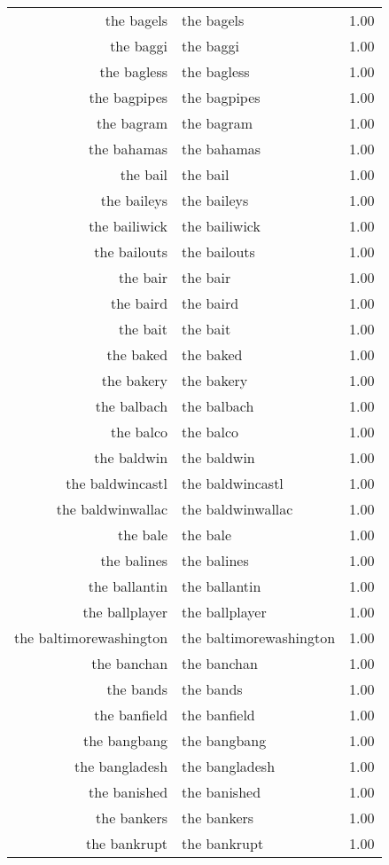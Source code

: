 \begin{table}[ht]
\begin{tabular}{rlr}
  the bagels & the bagels & 1.00 \\ 
  the baggi & the baggi & 1.00 \\ 
  the bagless & the bagless & 1.00 \\ 
  the bagpipes & the bagpipes & 1.00 \\ 
  the bagram & the bagram & 1.00 \\ 
  the bahamas & the bahamas & 1.00 \\ 
  the bail & the bail & 1.00 \\ 
  the baileys & the baileys & 1.00 \\ 
  the bailiwick & the bailiwick & 1.00 \\ 
  the bailouts & the bailouts & 1.00 \\ 
  the bair & the bair & 1.00 \\ 
  the baird & the baird & 1.00 \\ 
  the bait & the bait & 1.00 \\ 
  the baked & the baked & 1.00 \\ 
  the bakery & the bakery & 1.00 \\ 
  the balbach & the balbach & 1.00 \\ 
  the balco & the balco & 1.00 \\ 
  the baldwin & the baldwin & 1.00 \\ 
  the baldwincastl & the baldwincastl & 1.00 \\ 
  the baldwinwallac & the baldwinwallac & 1.00 \\ 
  the bale & the bale & 1.00 \\ 
  the balines & the balines & 1.00 \\ 
  the ballantin & the ballantin & 1.00 \\ 
  the ballplayer & the ballplayer & 1.00 \\ 
  the baltimorewashington & the baltimorewashington & 1.00 \\ 
  the banchan & the banchan & 1.00 \\ 
  the bands & the bands & 1.00 \\ 
  the banfield & the banfield & 1.00 \\ 
  the bangbang & the bangbang & 1.00 \\ 
  the bangladesh & the bangladesh & 1.00 \\ 
  the banished & the banished & 1.00 \\ 
  the bankers & the bankers & 1.00 \\ 
  the bankrupt & the bankrupt & 1.00 \\ 

\end{tabular}
\end{table}
